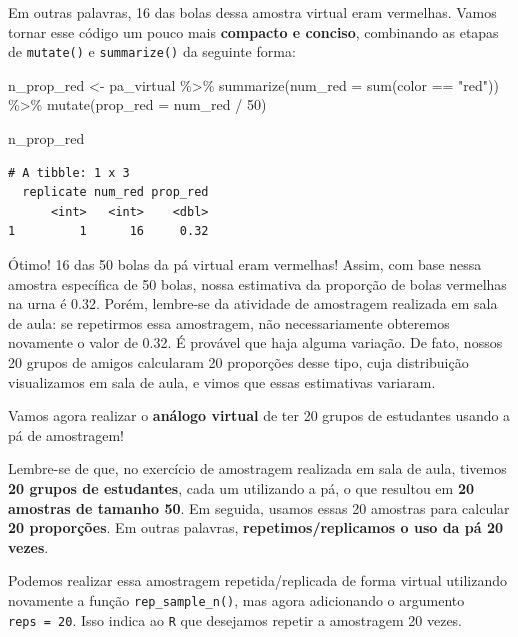 \documentclass[
  letterpaper,
  DIV=11,
  numbers=noendperiod]{scrreprt}
\newenvironment{Shaded}{\begin{snugshade}}{\end{snugshade}}
\newcommand{\AttributeTok}[1]{\textcolor[rgb]{0.40,0.45,0.13}{#1}}
\newcommand{\DecValTok}[1]{\textcolor[rgb]{0.68,0.00,0.00}{#1}}
\newcommand{\FunctionTok}[1]{\textcolor[rgb]{0.28,0.35,0.67}{#1}}
\newcommand{\NormalTok}[1]{\textcolor[rgb]{0.00,0.23,0.31}{#1}}
\newcommand{\OtherTok}[1]{\textcolor[rgb]{0.00,0.23,0.31}{#1}}
\newcommand{\SpecialCharTok}[1]{\textcolor[rgb]{0.37,0.37,0.37}{#1}}
\newcommand{\StringTok}[1]{\textcolor[rgb]{0.13,0.47,0.30}{#1}}
\begin{document}
Em outras palavras, 16 das bolas dessa amostra virtual eram vermelhas.
Vamos tornar esse código um pouco mais \textbf{compacto e conciso},
combinando as etapas de \texttt{mutate()} e \texttt{summarize()} da
seguinte forma:

\begin{Shaded}
\begin{Highlighting}[]
\NormalTok{n\_prop\_red }\OtherTok{\textless{}{-}}\NormalTok{ pa\_virtual }\SpecialCharTok{\%\textgreater{}\%}
\FunctionTok{summarize}\NormalTok{(}\AttributeTok{num\_red =} \FunctionTok{sum}\NormalTok{(color }\SpecialCharTok{==} \StringTok{"red"}\NormalTok{)) }\SpecialCharTok{\%\textgreater{}\%}
\FunctionTok{mutate}\NormalTok{(}\AttributeTok{prop\_red =}\NormalTok{ num\_red }\SpecialCharTok{/} \DecValTok{50}\NormalTok{)}

\NormalTok{n\_prop\_red}
\end{Highlighting}
\end{Shaded}

\begin{verbatim}
# A tibble: 1 x 3
  replicate num_red prop_red
      <int>   <int>    <dbl>
1         1      16     0.32
\end{verbatim}

Ótimo! 16 das 50 bolas da pá virtual eram vermelhas! Assim, com base
nessa amostra específica de 50 bolas, nossa estimativa da proporção de
bolas vermelhas na urna é 0.32. Porém, lembre-se da atividade de
amostragem realizada em sala de aula: se repetirmos essa amostragem, não
necessariamente obteremos novamente o valor de 0.32. É provável que haja
alguma variação. De fato, nossos 20 grupos de amigos calcularam 20
proporções desse tipo, cuja distribuição visualizamos em sala de aula, e
vimos que essas estimativas variaram.

Vamos agora realizar o \textbf{análogo virtual} de ter 20 grupos de
estudantes usando a pá de amostragem!

Lembre-se de que, no exercício de amostragem realizada em sala de aula,
tivemos \textbf{20 grupos de estudantes}, cada um utilizando a pá, o que
resultou em \textbf{20 amostras de tamanho 50}. Em seguida, usamos essas
20 amostras para calcular \textbf{20 proporções}. Em outras palavras,
\textbf{repetimos/replicamos o uso da pá 20 vezes}.

Podemos realizar essa amostragem repetida/replicada de forma virtual
utilizando novamente a função \texttt{rep\_sample\_n()}, mas agora
adicionando o argumento \texttt{reps\ =\ 20}. Isso indica ao \texttt{R}
que desejamos repetir a amostragem 20 vezes.
\end{document}
